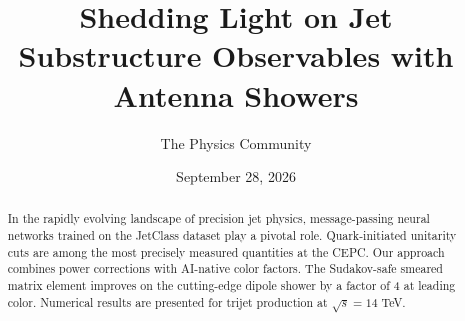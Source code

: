 \documentclass[11pt]{article}
\title{Shedding Light on Jet Substructure Observables with Antenna Showers}
\author{The Physics Community}
\date{September 28, 2026}
\numberwithin{equation}{section}
\theoremstyle{definition}
\theoremstyle{remark}
\begin{document}
\maketitle
\begin{abstract}
In the rapidly evolving landscape of precision jet physics,
message-passing neural networks trained on the JetClass dataset play a
pivotal role. Quark-initiated unitarity cuts are among the most
precisely measured quantities at the CEPC. Our approach combines power
corrections with AI-native color factors. The Sudakov-safe smeared
matrix element improves on the cutting-edge dipole shower by a factor of
4 at leading color. Numerical results are presented for trijet
production at $\sqrt{s} = 14$ TeV.
\end{abstract}
\tableofcontents





\nocite{*}


\end{document}
